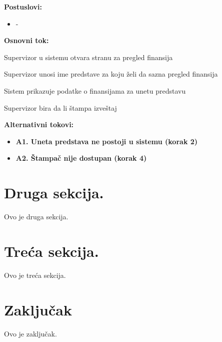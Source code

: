 \documentclass[a4paper]{article}
\begin{document}
\noindent\textbf{Postuslovi:} 
\begin{itemize}
  \item -
\end{itemize}

\noindent\textbf{Osnovni tok:} 
\begin{legal}
  \item Supervizor u sistemu otvara stranu za pregled finansija
  \item Supervizor unosi ime predstave za koju želi da sazna pregled finansija
  \item Sistem prikazuje podatke o finansijama za unetu predstavu
  \item Supervizor bira da li štampa izveštaj
\end{legal}

\noindent\textbf{Alternativni tokovi:}
\begin{itemize}
  \item \textbf{A1. Uneta predstava ne postoji u sistemu (korak 2)} 

  \item \textbf{A2. Štampač nije dostupan (korak 4)} 

\end{itemize}


\section{Druga sekcija.}
Ovo je druga sekcija.

\section{Treća sekcija.}
Ovo je treća sekcija.

\section{Zaključak}
Ovo je zaključak.

\newpage

\appendix
 

\end{document}
